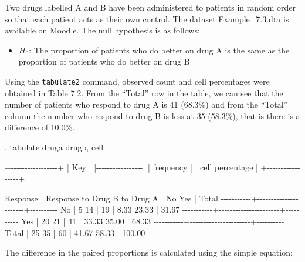 \documentclass[
]{memoir}
\newenvironment{Shaded}{\begin{snugshade}}{\end{snugshade}}
\newcommand{\NormalTok}[1]{#1}
\providecommand{\tightlist}{%
  \setlength{\itemsep}{0pt}\setlength{\parskip}{0pt}}
\begin{document}
Two drugs labelled A and B have been administered to patients in random order so that each patient acts as their own control. The dataset Example\_7.3.dta is available on Moodle. The null hypothesis is as follows:

\begin{itemize}
\tightlist
\item
  \(H_0\): The proportion of patients who do better on drug A is the same as the proportion of patients who do better on drug B
\end{itemize}

Using the \texttt{tabulate2} command, observed count and cell percentages were obtained in Table 7.2. From the ``Total'' row in the table, we can see that the number of patients who respond to drug A is 41 (68.3\%) and from the ``Total'' column the number who respond to drug B is less at 35 (58.3\%), that is there is a difference of 10.0\%.

\begin{Shaded}
\begin{Highlighting}[]
\NormalTok{. tabulate druga drugb, cell}

\NormalTok{+{-}{-}{-}{-}{-}{-}{-}{-}{-}{-}{-}{-}{-}{-}{-}{-}{-}+}
\NormalTok{| Key             |}
\NormalTok{|{-}{-}{-}{-}{-}{-}{-}{-}{-}{-}{-}{-}{-}{-}{-}{-}{-}|}
\NormalTok{|    frequency    |}
\NormalTok{| cell percentage |}
\NormalTok{+{-}{-}{-}{-}{-}{-}{-}{-}{-}{-}{-}{-}{-}{-}{-}{-}{-}+}

\NormalTok{  Response |  Response to Drug B}
\NormalTok{ to Drug A |        No        Yes |     Total}
\NormalTok{{-}{-}{-}{-}{-}{-}{-}{-}{-}{-}{-}+{-}{-}{-}{-}{-}{-}{-}{-}{-}{-}{-}{-}{-}{-}{-}{-}{-}{-}{-}{-}{-}{-}+{-}{-}{-}{-}{-}{-}{-}{-}{-}{-}}
\NormalTok{        No |         5         14 |        19 }
\NormalTok{           |      8.33      23.33 |     31.67 }
\NormalTok{{-}{-}{-}{-}{-}{-}{-}{-}{-}{-}{-}+{-}{-}{-}{-}{-}{-}{-}{-}{-}{-}{-}{-}{-}{-}{-}{-}{-}{-}{-}{-}{-}{-}+{-}{-}{-}{-}{-}{-}{-}{-}{-}{-}}
\NormalTok{       Yes |        20         21 |        41 }
\NormalTok{           |     33.33      35.00 |     68.33 }
\NormalTok{{-}{-}{-}{-}{-}{-}{-}{-}{-}{-}{-}+{-}{-}{-}{-}{-}{-}{-}{-}{-}{-}{-}{-}{-}{-}{-}{-}{-}{-}{-}{-}{-}{-}+{-}{-}{-}{-}{-}{-}{-}{-}{-}{-}}
\NormalTok{     Total |        25         35 |        60 }
\NormalTok{           |     41.67      58.33 |    100.00 }
\end{Highlighting}
\end{Shaded}

The difference in the paired proportions is calculated using the simple equation:
\end{document}

